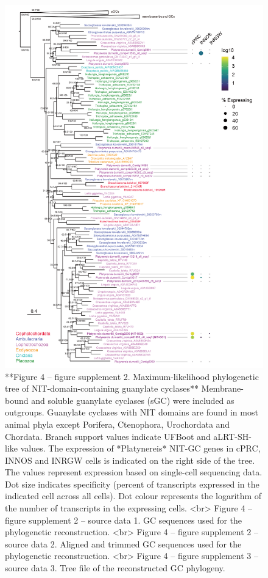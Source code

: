 \documentclass[
  10pt,
  onecolumn]{article}
\begin{document}
\begin{figure}
\includegraphics[width=20.83in]{figures/Fig4_sup2} \caption{**Figure 4 -- figure supplement 2. Maximum-likelihood phylogenetic tree of NIT-domain-containing guanylate cyclases** Membrane-bound and soluble guanylate cyclases (sGC) were included as outgroups. Guanylate cyclases with NIT domains are found in most animal phyla except Porifera, Ctenophora, Urochordata and Chordata. Branch support values indicate UFBoot and aLRT-SH-like values. The expression of *Platynereis* NIT-GC genes in cPRC, INNOS and INRGW cells is indicated on the right side of the tree. The values represent expression based on single-cell sequencing data. Dot size indicates specificity (percent of transcripts expressed in the indicated cell across all cells). Dot colour represents the logarithm of the number of transcripts in the expressing cells. <br> Figure 4 -- figure supplement 2 -- source data 1. GC sequences used for the phylogenetic reconstruction. <br> Figure 4 -- figure supplement 2 -- source data 2. Aligned and trimmed GC sequences used for the phylogenetic reconstruction. <br> Figure 4 -- figure supplement 3 -- source data 3. Tree file of the reconstructed GC phylogeny. }\label{fig:unnamed-chunk-14}
\end{figure}
\end{document}
